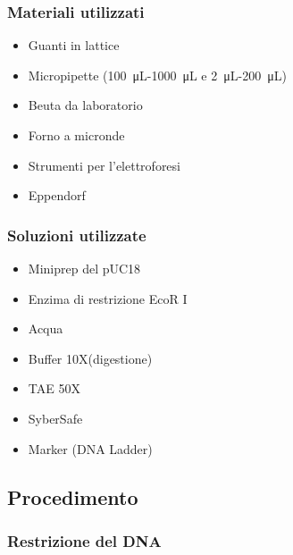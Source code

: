 \subsubsection{Materiali utilizzati}

\begin{itemize}
	\item Guanti in lattice
	\item Micropipette (\SI{100}{\micro\liter}-\SI{1000}{\micro\liter} e \SI{2}{\micro\liter}-\SI{200}{\micro\liter})
	\item Beuta da laboratorio
	\item Forno a micronde
	\item Strumenti per l'elettroforesi
	\item Eppendorf
\end{itemize}

\subsubsection{Soluzioni utilizzate}

\begin{itemize}

	\item Miniprep del pUC18
	\item Enzima di restrizione EcoR I
	\item Acqua
	\item Buffer 10X(digestione)
	\item TAE 50X
	\item SyberSafe
	\item Marker (DNA Ladder)

\end{itemize}

\subsection{Procedimento}

\subsubsection{Restrizione del DNA}

